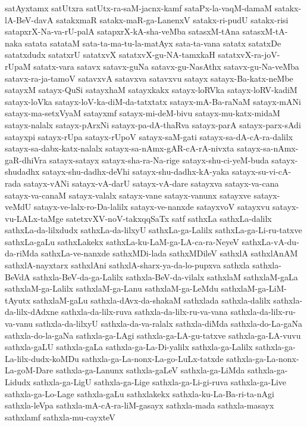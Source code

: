 {satAyxtamx
satUtxra
satUtx-ra-saM-jacnx-kamf
sataPx-la-vaqM-damaM
satakx-lA-BeV-davA
satakxmaR
satakx-maR-ga-LanenxV
satakx-ri-pudU
satakx-risi
satapxrX-Na-va-rU-palA
satapxrX-kA-sha-veMba
satasxM-tAna
satasxM-tA-naka
satata
satataM
sata-ta-ma-tu-la-matAyx
sata-ta-vana
satatx
satatxDe
satatxdudx
satatxrU
satatxvX
satatxvX-gu-NA-tamxkaH
satatxvX-ra-joV-rUpaM
satatx-vara
satavx
satavx-guNa
satavx-gu-NasAthx
satavx-gu-Na-veMba
satavx-ra-ja-tamoV
satavxvA
satavxva
satavxvu
satayx
satayx-Ba-katx-neMbe
satayxM
satayx-QuSi
satayxhaM
satayxkakx
satayx-loRVka
satayx-loRV-kadiM
satayx-loVka
satayx-loV-ka-diM-da-tatxtatx
satayx-mA-Ba-raNaM
satayx-mANi
satayx-ma-setxVyaM
satayxmf
satayx-mi-deM-bivu
satayx-mu-katx-midaM
satayx-nalalx
satayx-pArxNi
satayx-pa-dA-thaRva
satayx-parA
satayx-parx-sAdi
satayxpi
satayx-rUpa
satayx-rUpoV
satayx-saM-gati
satayx-sa-dA-cA-ra-dalilx
satayx-sa-dabx-katx-nalalx
satayx-sa-nAmx-gAR-cA-rA-nivxta
satayx-sa-nAmx-gaR-dhiVra
satayx-satayx
satayx-sha-ra-Na-rige
satayx-shu-ci-yeM-buda
satayx-shudadhx
satayx-shu-dadhx-deVhi
satayx-shu-dadhx-kA-yaka
satayx-su-vi-cA-rada
satayx-vANi
satayx-vA-darU
satayx-vA-dare
satayxva
satayx-va-cana
satayx-va-canaM
satayx-valalx
satayx-vane
satayx-vanunx
satayxve
satayx-veMdU
satayx-ve-lalx-ro-Da-lalilx
satayx-ve-nanxde
satayxvoV
satayxvu
satayx-vu-LALx-taMge
satetxvXV-noV-takxqqSaTx
satf
sathxLa
sathxLa-dalilx
sathxLa-da-lilxdudx
sathxLa-da-lilxyU
sathxLa-ga-Lalilx
sathxLa-ga-Li-ru-tatxve
sathxLa-gaLu
sathxLakekx
sathxLa-ku-LaM-ga-LA-ca-ra-NeyeV
sathxLa-vA-du-da-riMda
sathxLa-ve-nanxde
sathxMDi-lada
sathxMDileV
sathxlA
sathxlAnAM
sathxlA-nayxtarx
sathxlAni
sathxlA-sharx-ya-da-lo-pupxva
sathxla
sathxla-BeVdA
sathxla-BeV-da-ga-Lalilx
sathxla-BeV-da-vilalx
sathxlaM
sathxlaM-gaLa
sathxlaM-ga-Lalilx
sathxlaM-ga-Lanu
sathxlaM-ga-LeMdu
sathxlaM-ga-LiM-tAyutx
sathxlaM-gaLu
sathxla-dAvx-da-shakaM
sathxlada
sathxla-dalilx
sathxla-da-lilx-dAdxne
sathxla-da-lilx-ruva
sathxla-da-lilx-ru-va-vana
sathxla-da-lilx-ru-va-vanu
sathxla-da-lilxyU
sathxla-da-va-ralalx
sathxla-diMda
sathxla-do-La-gaNa
sathxla-do-la-gaNa
sathxla-ga-LAgi
sathxla-ga-LA-gu-tatxve
sathxla-ga-LA-vuvu
sathxla-gaLU
sathxla-gaLa
sathxla-ga-La-Di-yalilx
sathxla-ga-Lalilx
sathxla-ga-La-lilx-dudx-koMDu
sathxla-ga-La-nonx-La-go-LuLx-tatxde
sathxla-ga-La-nonx-La-goM-Dare
sathxla-ga-Lanunx
sathxla-gaLeV
sathxla-ga-LiMda
sathxla-ga-Lidudx
sathxla-ga-LigU
sathxla-ga-Lige
sathxla-ga-Li-gi-ruva
sathxla-ga-Live
sathxla-ga-Lo-Lage
sathxla-gaLu
sathxlakekx
sathxla-ku-La-Ba-ri-ta-nAgi
sathxla-leVpa
sathxla-mA-cA-ra-liM-gasayx
sathxla-mada
sathxla-masayx
sathxlamf
sathxla-mu-cayxteV
}
